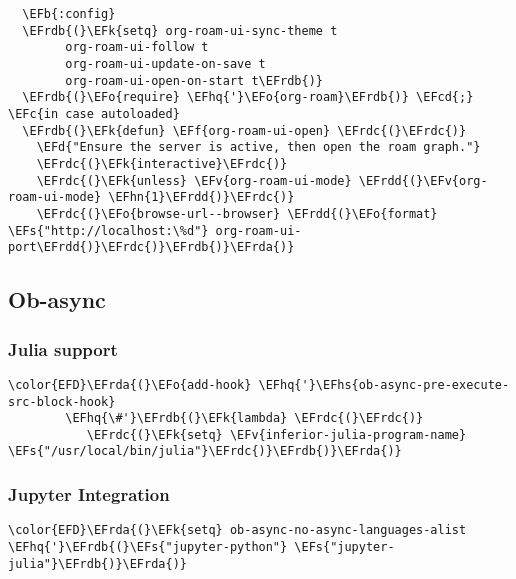 \documentclass[c]{article}
\theoremstyle{plain}%
\theoremstyle{definition}
\theoremstyle{remark}
\newcommand{\EFc}[1]{\textcolor{EFc}{#1}} %
\newcommand{\EFcd}[1]{\textcolor{EFcd}{#1}} %
\newcommand{\EFs}[1]{\textcolor{EFs}{#1}} %
\newcommand{\EFd}[1]{\textcolor{EFd}{#1}} %
\newcommand{\EFk}[1]{\textcolor{EFk}{#1}} %
\newcommand{\EFb}[1]{\textcolor{EFb}{#1}} %
\newcommand{\EFf}[1]{\textcolor{EFf}{#1}} %
\newcommand{\EFv}[1]{\textcolor{EFv}{#1}} %
\newcommand{\EFo}[1]{\textcolor{EFo}{#1}} %
\newcommand{\EFhn}[1]{\textcolor{EFhn}{\textbf{#1}}} %
\newcommand{\EFhq}[1]{\textcolor{EFhq}{#1}} %
\newcommand{\EFhs}[1]{\textcolor{EFhs}{#1}} %
\newcommand{\EFrda}[1]{\textcolor{EFrda}{#1}} %
\newcommand{\EFrdb}[1]{\textcolor{EFrdb}{#1}} %
\newcommand{\EFrdc}[1]{\textcolor{EFrdc}{#1}} %
\newcommand{\EFrdd}[1]{\textcolor{EFrdd}{#1}} %
\begin{document}
\begin{enumerate}
\begin{Code}
\begin{Verbatim}
  \EFb{:config}
  \EFrdb{(}\EFk{setq} org-roam-ui-sync-theme t
        org-roam-ui-follow t
        org-roam-ui-update-on-save t
        org-roam-ui-open-on-start t\EFrdb{)}
  \EFrdb{(}\EFo{require} \EFhq{'}\EFo{org-roam}\EFrdb{)} \EFcd{;} \EFc{in case autoloaded}
  \EFrdb{(}\EFk{defun} \EFf{org-roam-ui-open} \EFrdc{(}\EFrdc{)}
    \EFd{"Ensure the server is active, then open the roam graph."}
    \EFrdc{(}\EFk{interactive}\EFrdc{)}
    \EFrdc{(}\EFk{unless} \EFv{org-roam-ui-mode} \EFrdd{(}\EFv{org-roam-ui-mode} \EFhn{1}\EFrdd{)}\EFrdc{)}
    \EFrdc{(}\EFo{browse-url--browser} \EFrdd{(}\EFo{format} \EFs{"http://localhost:\%d"} org-roam-ui-port\EFrdd{)}\EFrdc{)}\EFrdb{)}\EFrda{)}
\end{Verbatim}
\end{Code}
\end{enumerate}
\subsection{Ob-async}
\label{sec:org111b068}
\subsubsection{Julia support}
\label{sec:org8491750}
\begin{Code}
\begin{Verbatim}
\color{EFD}\EFrda{(}\EFo{add-hook} \EFhq{'}\EFhs{ob-async-pre-execute-src-block-hook}
        \EFhq{\#'}\EFrdb{(}\EFk{lambda} \EFrdc{(}\EFrdc{)}
           \EFrdc{(}\EFk{setq} \EFv{inferior-julia-program-name} \EFs{"/usr/local/bin/julia"}\EFrdc{)}\EFrdb{)}\EFrda{)}
\end{Verbatim}
\end{Code}
\subsubsection{Jupyter Integration}
\label{sec:org0ec1c56}
\begin{Code}
\begin{Verbatim}
\color{EFD}\EFrda{(}\EFk{setq} ob-async-no-async-languages-alist \EFhq{'}\EFrdb{(}\EFs{"jupyter-python"} \EFs{"jupyter-julia"}\EFrdb{)}\EFrda{)}
\end{Verbatim}
\end{Code}
\end{document}
